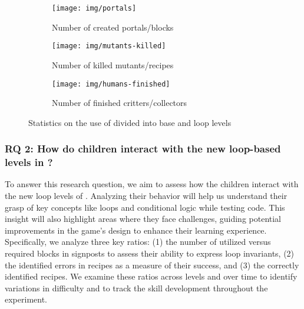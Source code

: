 \begin{figure*}
	\vspace{-1.5em}
	\centering
	\begin{subfigure}[t]{0.325\textwidth}
		\centering
		\texttt{[image: img/portals]}
		\vspace{-3.5em}
		\caption{Number of created portals/blocks}
		\label{fig:boxmines}
	\end{subfigure}
	\hfill
	\begin{subfigure}[t]{0.325\textwidth}
		\centering
		\texttt{[image: img/mutants-killed]}
		\vspace{-3.5em}
		\caption{Number of killed mutants/recipes}
		\label{fig:boxmutants}
	\end{subfigure}
	\hfill
	\begin{subfigure}[t]{0.325\textwidth}
		\centering
		\texttt{[image: img/humans-finished]}
		\vspace{-3.5em}
		\caption{Number of finished critters/collectors}
		\label{fig:boxhumans}
	\end{subfigure}
	
	\caption{Statistics on the use of \toolname divided into base and loop levels}
	\label{fig:testboxes}
\end{figure*}

\subsubsection{RQ 2: How do children interact with the new loop-based levels in \toolname?}

To answer this research question, we aim to assess how the children interact with the new loop levels of \toolname. Analyzing their behavior will help us understand their grasp of key concepts like loops and conditional logic while testing code. This insight will also highlight areas where they face challenges, guiding potential improvements in the game's design to enhance their learning experience. Specifically, we analyze three key ratios: (1) the number of utilized versus required blocks in signposts to assess their ability to express loop invariants, (2) the identified errors in recipes as a measure of their success, and (3) the correctly identified recipes. We examine these ratios across levels and over time to identify variations in difficulty and to track the skill development throughout the experiment.


